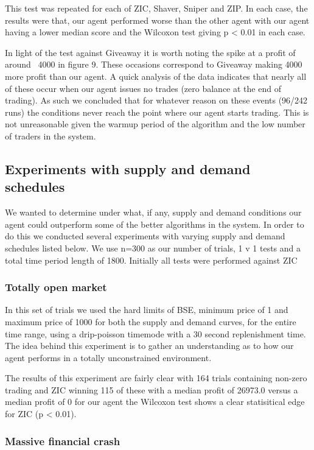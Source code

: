 \documentclass{acm_proc_article-sp}
\begin{document}
This test was repeated for each of ZIC, Shaver, Sniper and ZIP. In each case,
the results were that, our agent performed worse than the other
agent with our agent having a lower median score and the Wilcoxon test giving
p < 0.01 in each case.

In light of the test against Giveaway it is  worth noting the spike at a profit
of around ~4000 in figure 9.  These occasions correspond to Giveaway making
4000 more profit than our agent. A quick analysis of the data indicates that
nearly all of these occur when our agent issues no trades (zero balance at the
end of trading). As such we concluded that for whatever reason on these events
(96/242 runs) the conditions never reach the point where our agent starts
trading. This is not unreasonable given the warmup period of the algorithm and
the low number of traders in the system.

\subsection{Experiments with supply and demand schedules}

We wanted to determine under what, if any, supply and demand conditions our
agent could outperform some of the better algorithms in the system. In order to
do this we conducted several experiments with varying supply and demand
schedules listed below. We use n=300 as our number of trials, 1 v 1 tests and a
total time period length of 1800. Initially all tests were performed against
ZIC

\subsubsection{Totally open market}

In this set of trials we used the hard limits of BSE, minimum price of 1 and
maximum price of 1000 for both the supply and demand curves, for the entire
time range, using a drip-poisson timemode with a 30 second replenishment time.
The idea behind this experiment is to gather an understanding as to how our
agent performs in a totally unconstrained environment.

The results of this experiment are fairly clear with 164 trials containing
non-zero trading and ZIC winning 115 of these with a median profit of 26973.0
versus a median profit of 0 for our agent the Wilcoxon test shows a clear
statisitical edge for ZIC (p < 0.01).

\subsubsection{Massive financial crash}
\end{document}
